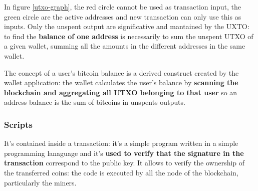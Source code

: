 \documentclass[10pt,a4paper]{report}
\begin{document}
In figure \ref{utxo-graph}, the red circle cannot be used as transaction input, the green circle are the active addresses and new transaction can only use this as inputs. Only the unspent output are significative and mantained by the UXTO: to find the \textbf{balance of one address} is necessarily to sum the unspent UTXO of a given wallet, summing all the amounts in the different addresses in the same wallet.

The concept of a user’s bitcoin balance is a derived construct created by the wallet application: the wallet calculates the user’s balance by \textbf{scanning the blockchain and aggregating all UTXO belonging to that user} so an address balance is the sum of bitcoins in unspents outputs.
\subsubsection{Scripts}\label{sec:scripts}
It's contained inside a transaction: it's a simple program written in a simple programming lanaguage and it's \textbf{used to verify that the signature in the transaction} correspond to the public key. It allows to verify the ownership of the transferred coins: the code is executed by all the node of the blockchain, particularly the miners.
\end{document}

